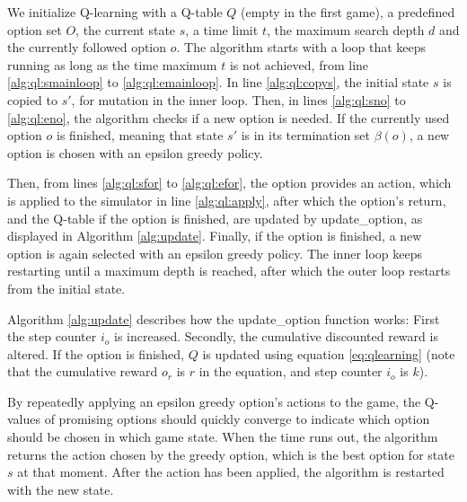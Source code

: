 We initialize Q-learning with a Q-table $Q$ (empty in the first game), a
predefined option set $O$, the current state $s$, a time limit $t$, the maximum
search depth $d$ and the currently followed option $o$. The algorithm starts
with a loop that keeps running as long as the time maximum $t$ is not achieved,
from line \ref{alg:ql:smainloop} to \ref{alg:ql:emainloop}. In line
\ref{alg:ql:copys}, the initial state $s$ is copied to $s'$, for mutation in the
inner loop. Then, in lines \ref{alg:ql:sno} to \ref{alg:ql:eno}, the algorithm
checks if a new option is needed. If the currently used option $o$ is finished,
meaning that state $s'$ is in its termination set $\beta(o)$, a new option is
chosen with an epsilon greedy policy. 

Then, from lines \ref{alg:ql:sfor} to \ref{alg:ql:efor}, the option provides an
action, which is applied to the simulator in line \ref{alg:ql:apply}, after
which the option's return, and the Q-table if the option is finished, are
updated by \textsf{update\_option}, as displayed in Algorithm \ref{alg:update}.
Finally, if the option is finished, a new option is again selected with an
epsilon greedy policy. The inner loop keeps restarting until a maximum depth is
reached, after which the outer loop restarts from the initial state.

Algorithm \ref{alg:update} describes how the \textsf{update\_option}
function works: First the step counter $i_o$ is increased. Secondly, the
cumulative discounted reward is altered. If the option is finished, $Q$ is
updated using equation \ref{eq:qlearning} (note that the cumulative reward $o_r$
is $r$ in the equation, and step counter $i_o$ is $k$).

By repeatedly applying an epsilon greedy option's actions to the game, the
Q-values of promising options should quickly converge to indicate which option
should be chosen in which game state. When the time runs out, the algorithm
returns the action chosen by the greedy option, which is the best option for
state $s$ at that moment. After the action has been applied, the algorithm is
restarted with the new state. 
